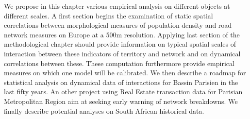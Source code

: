 

We propose in this chapter various empirical analysis on different objects at different scales. A first section begins the examination of static spatial correlations between morphological measures of population density and road network measures on Europe at a 500m resolution. Applying last section of the methodological chapter should provide information on typical spatial scales of interaction between these indicators 
 of territory and network and on dynamical correlations between these. These computation furthermore provide empirical measures on which one model will be calibrated. We then describe a roadmap for statistical analysis on dynamical data of interactions for Bassin Parisien in the last fifty years. An other project using Real Estate transaction data for Parisian Metropolitan Region aim at seeking early warning of network breakdowns. We finally describe potential analyses on South African historical data. 














